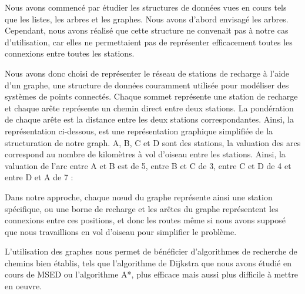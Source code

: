 \documentclass[french,a4paper]{article}
\begin{document}
    Nous avons commencé par étudier les structures de données vues en cours tels que les listes, les arbres et les graphes. Nous avons d'abord envisagé
    les arbres. Cependant, nous avons réalisé que cette structure ne convenait pas à notre cas d'utilisation, car elles
    ne permettaient pas de représenter efficacement toutes les connexions entre toutes les stations.

    Nous avons donc choisi de représenter le réseau de stations de recharge à l'aide d'un graphe, une structure de données couramment utilisée pour
    modéliser des systèmes de points connectés. Chaque sommet représente une station de recharge et chaque arête représente un chemin direct
    entre deux stations. La pondération de chaque arête est la distance entre les deux stations correspondantes.
    Ainsi, la représentation ci-dessous, est une représentation graphique simplifiée de la structuration de notre graph. A, B, C et D sont des
    stations, la valuation des arcs correspond au nombre de kilomètres à vol d'oiseau entre les stations. Ainsi, la valuation de l'arc entre A et B
    est de 5, entre B et C de 3, entre C et D de 4 et entre D et A de 7 :

    \begin{center}
    \end{center}

    Dans notre approche, chaque nœud du graphe représente ainsi une station spécifique, ou une borne de recharge et les arêtes du graphe représentent
    les connexions entre ces positions, et donc les routes même si nous avons supposé que nous travaillions en vol d'oiseau pour simplifier le problème.

    L'utilisation des graphes nous permet de bénéficier d'algorithmes de recherche de chemins bien établis, tels que l'algorithme de Dijkstra que nous avons
    étudié en cours de MSED ou l'algorithme A*, plus efficace mais aussi plus difficile à mettre en oeuvre.
\end{document}
